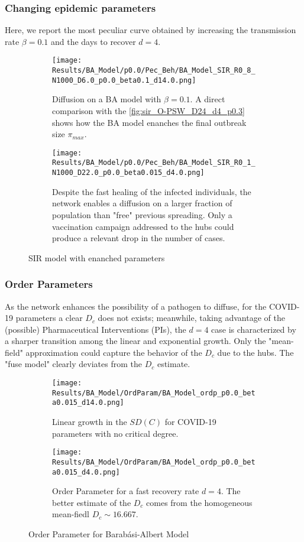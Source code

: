 \documentclass[a4paper,10pt,twoside]{book} %
\theoremstyle{definition}
\begin{document}
\subsubsection{Changing epidemic parameters}
Here, we report the most peculiar curve obtained by increasing the transmission rate $ \beta = 0.1$ and the days to recover $ d = 4$. 
\begin{figure}[H]
	\begin{subfigure}{\linewidth}
		\centering
		\texttt{[image: Results/BA\_Model/p0.0/Pec\_Beh/BA\_Model\_SIR\_R0\_8\_N1000\_D6.0\_p0.0\_beta0.1\_d14.0.png]}
		\caption{Diffusion on a BA model with $\beta = 0.1$. A direct comparison with the \autoref{fig:sir_O-PSW_D24_d4_p0.3} shows how the BA model enanches the final outbreak size $\pi_{max}$.}
		\label{fig:sir_BA_D6_b0.1}
	\end{subfigure}
	\par\bigskip
	\begin{subfigure}{\linewidth}
		\centering
		\texttt{[image: Results/BA\_Model/p0.0/Pec\_Beh/BA\_Model\_SIR\_R0\_1\_N1000\_D22.0\_p0.0\_beta0.015\_d4.0.png]}
		\caption{Despite the fast healing of the infected individuals, the network enables a diffusion on a larger fraction of population than "free" previous spreading. Only a vaccination campaign addressed to the hubs could produce a relevant drop in the number of cases.}
		\label{fig:sir_BA_d4D22}
	\end{subfigure}
	\caption{SIR model with enanched parameters}
\end{figure}

\clearpage
\subsubsection*{Order Parameters}
As the network enhances the possibility of a pathogen to diffuse, for the COVID-19 parameters a clear $D_c$ does not exists; meanwhile, taking advantage of the (possible) Pharmaceutical Interventions (PIs), the $d = 4$ case is characterized by a sharper transition among the linear and exponential growth. Only the "mean-field" approximation could capture the behavior of the $ D_c$ due to the hubs. The "fuse model" clearly deviates from the $ D_c$ estimate. 
\begin{figure}[t]
	\begin{subfigure}[t]{0.48\linewidth}
		\centering
		\texttt{[image: Results/BA\_Model/OrdParam/BA\_Model\_ordp\_p0.0\_beta0.015\_d14.0.png]}
		\caption{Linear growth in the $SD(C)$ for COVID-19 parameters with no critical degree.}
		\label{fig:Ordp_BA_d14}
	\end{subfigure}
	\hfill
	\begin{subfigure}[t]{0.48\linewidth}
		\centering
		\texttt{[image: Results/BA\_Model/OrdParam/BA\_Model\_ordp\_p0.0\_beta0.015\_d4.0.png]}
		\caption{Order Parameter for a fast recovery rate $ d = 4$. The better estimate of the $ D_c$ comes from the homogeneous mean-fiedl $ D_c \sim 16.667$.}
		\label{fig:Ordp_BA_COVID_d1}
	\end{subfigure}
	\caption{Order Parameter for Barabási-Albert Model}
	\label{fig:Ordp_BA_COVID}
\end{figure}
\end{document}
